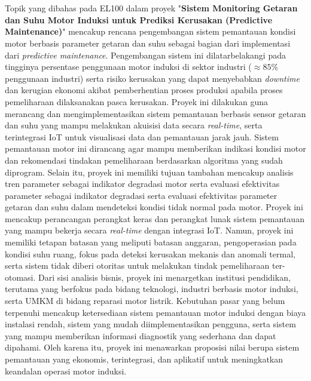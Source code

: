 \documentclass{elsinta}
\begin{document}
\section*{\docsumary}
Topik yang dibahas pada EL100 dalam proyek "\textbf{Sistem Monitoring Getaran dan Suhu Motor Induksi untuk Prediksi Kerusakan (Predictive Maintenance)}" mencakup rencana pengembangan sistem pemantauan kondisi motor berbasis parameter getaran dan suhu sebagai bagian dari implementasi dari \textit{predictive maintenance}. Pengembangan sistem ini dilatarbelakangi pada tingginya persentase penggunaan motor induksi di sektor industri ($\approx 85\%$ penggunaan industri) serta risiko kerusakan yang dapat menyebabkan \textit{downtime} dan kerugian ekonomi akibat pemberhentian proses produksi apabila proses pemeliharaan dilaksanakan pasca kerusakan. 
Proyek ini dilakukan guna merancang dan mengimplementasikan sistem pemantauan berbasis sensor getaran dan suhu yang mampu melakukan akuisisi data secara \textit{real-time}, serta terintegrasi IoT untuk visualisasi data dan pemantauan jarak jauh. Sistem pemantauan motor ini dirancang agar mampu memberikan indikasi kondisi motor dan rekomendasi tindakan pemeliharaan berdasarkan algoritma yang sudah diprogram. Selain itu, proyek ini memiliki tujuan tambahan mencakup analisis tren parameter sebagai indikator degradasi motor serta evaluasi efektivitas parameter sebagai indikator degradasi serta evaluasi efektivitas parameter getaran dan suhu dalam mendeteksi kondisi tidak normal pada motor.
Proyek ini mencakup perancangan perangkat keras dan perangkat lunak sistem pemantauan yang mampu bekerja secara \textit{real-time} dengan integrasi IoT. Namun, proyek ini memiliki tetapan batasan yang meliputi batasan anggaran, pengoperasian pada kondisi suhu ruang, fokus pada deteksi kerusakan mekanis dan anomali termal, serta sistem tidak diberi otoritas untuk melakukan tindak pemeliharaan ter-otomasi.
Dari sisi analisis bisnis, proyek ini menargetkan institusi pendidikan, terutama yang berfokus pada bidang teknologi, industri berbasis motor induksi, serta UMKM di bidang reparasi motor listrik. Kebutuhan pasar yang belum terpenuhi mencakup ketersediaan sistem pemantauan motor induksi dengan biaya instalasi rendah, sistem yang mudah diimplementasikan pengguna, serta sistem yang mampu memberikan informasi diagnostik yang sederhana dan dapat dipahami. Oleh karena itu, proyek ini menawarkan proposisi nilai berupa sistem pemantauan yang ekonomis, terintegrasi, dan aplikatif untuk meningkatkan keandalan operasi motor induksi.
\end{document}
